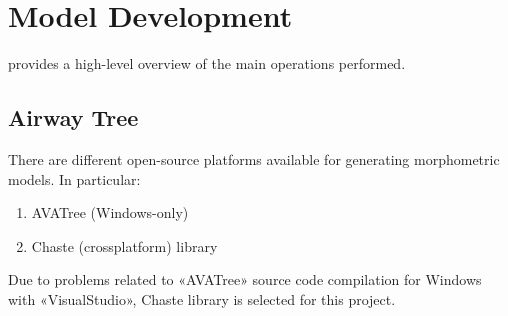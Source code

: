 \section{Model Development}



 provides a high-level overview of the main
operations performed.





\subsection{Airway Tree}
\label{subsec:airway_development}
There are different open-source platforms available for generating morphometric models.  In particular:

\begin{enumerate}
\item AVATree (Windows-only)
\item Chaste (crossplatform) library
\end{enumerate}

Due to problems related to «AVATree» source code compilation for
Windows with «VisualStudio», Chaste library is selected for this
project.

